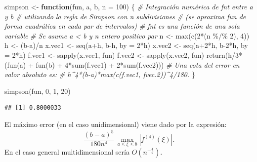 \documentclass[
]{book}
\newenvironment{Shaded}{\begin{snugshade}}{\end{snugshade}}
\newcommand{\AttributeTok}[1]{\textcolor[rgb]{0.77,0.63,0.00}{#1}}
\newcommand{\CommentTok}[1]{\textcolor[rgb]{0.56,0.35,0.01}{\textit{#1}}}
\newcommand{\ControlFlowTok}[1]{\textcolor[rgb]{0.13,0.29,0.53}{\textbf{#1}}}
\newcommand{\DecValTok}[1]{\textcolor[rgb]{0.00,0.00,0.81}{#1}}
\newcommand{\FunctionTok}[1]{\textcolor[rgb]{0.00,0.00,0.00}{#1}}
\newcommand{\NormalTok}[1]{#1}
\newcommand{\OtherTok}[1]{\textcolor[rgb]{0.56,0.35,0.01}{#1}}
\newcommand{\SpecialCharTok}[1]{\textcolor[rgb]{0.00,0.00,0.00}{#1}}
\theoremstyle{break}
\theoremstyle{nonumberplain}
\begin{document}
\begin{Shaded}
\begin{Highlighting}[]
\NormalTok{simpson }\OtherTok{\textless{}{-}} \ControlFlowTok{function}\NormalTok{(fun, a, b, }\AttributeTok{n =} \DecValTok{100}\NormalTok{) \{ }
\CommentTok{\# Integración numérica de fnt entre a y b}
\CommentTok{\# utilizando la regla de Simpson con n subdivisiones}
\CommentTok{\# (se aproxima fun de forma cuadrática en cada par de intervalos)  }
\CommentTok{\# fnt es una función de una sola variable}
\CommentTok{\# Se asume a \textless{} b y n entero positivo par }
\NormalTok{  n }\OtherTok{\textless{}{-}} \FunctionTok{max}\NormalTok{(}\FunctionTok{c}\NormalTok{(}\DecValTok{2}\SpecialCharTok{*}\NormalTok{(n }\SpecialCharTok{\%/\%} \DecValTok{2}\NormalTok{), }\DecValTok{4}\NormalTok{))}
\NormalTok{  h }\OtherTok{\textless{}{-}}\NormalTok{ (b}\SpecialCharTok{{-}}\NormalTok{a)}\SpecialCharTok{/}\NormalTok{n}
\NormalTok{  x.vec1 }\OtherTok{\textless{}{-}} \FunctionTok{seq}\NormalTok{(a}\SpecialCharTok{+}\NormalTok{h, b}\SpecialCharTok{{-}}\NormalTok{h, }\AttributeTok{by =} \DecValTok{2}\SpecialCharTok{*}\NormalTok{h)}
\NormalTok{  x.vec2 }\OtherTok{\textless{}{-}} \FunctionTok{seq}\NormalTok{(a}\SpecialCharTok{+}\DecValTok{2}\SpecialCharTok{*}\NormalTok{h, b}\DecValTok{{-}2}\SpecialCharTok{*}\NormalTok{h, }\AttributeTok{by =} \DecValTok{2}\SpecialCharTok{*}\NormalTok{h)}
\NormalTok{  f.vec1 }\OtherTok{\textless{}{-}} \FunctionTok{sapply}\NormalTok{(x.vec1, fun)}
\NormalTok{  f.vec2 }\OtherTok{\textless{}{-}} \FunctionTok{sapply}\NormalTok{(x.vec2, fun)}
  \FunctionTok{return}\NormalTok{(h}\SpecialCharTok{/}\DecValTok{3}\SpecialCharTok{*}\NormalTok{(}\FunctionTok{fun}\NormalTok{(a) }\SpecialCharTok{+} \FunctionTok{fun}\NormalTok{(b) }\SpecialCharTok{+} \DecValTok{4}\SpecialCharTok{*}\FunctionTok{sum}\NormalTok{(f.vec1) }\SpecialCharTok{+} \DecValTok{2}\SpecialCharTok{*}\FunctionTok{sum}\NormalTok{(f.vec2)))}
  \CommentTok{\# Una cota del error en valor absoluto es:}
  \CommentTok{\# h\^{}4*(b{-}a)*max(c(f.vec1, fvec.2))\^{}4/180.}
\NormalTok{\}}

\FunctionTok{simpson}\NormalTok{(fun, }\DecValTok{0}\NormalTok{, }\DecValTok{1}\NormalTok{, }\DecValTok{20}\NormalTok{)}
\end{Highlighting}
\end{Shaded}

\begin{verbatim}
## [1] 0.8000033
\end{verbatim}

El máximo error (en el caso unidimensional) viene dado por la expresión:
\[\frac{(b-a)^5}{180n^4}\,\max_{a\leq \xi \leq b}\left| f^{(4)}(\xi) \right|.\]
En el caso general multidimensional sería \(O(n^{-\frac{4}{d}})\).
\end{document}
